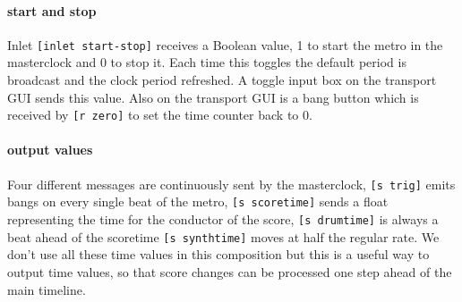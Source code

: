 \paragraph{start and stop}
Inlet \verb+[inlet start-stop]+ receives a Boolean value, 1 to start
the metro in the masterclock and 0 to stop it. Each time this
toggles the default period is broadcast and the clock period refreshed.
A toggle input box on the transport GUI sends this value. Also 
on the transport GUI is a bang button which is received by \verb+[r zero]+
to set the time counter back to 0.

\paragraph{output values}
Four different messages are continuously sent by the masterclock, 
\verb+[s trig]+ emits bangs on every single beat of the metro, 
\verb+[s scoretime]+ sends a float representing the time for the conductor of the score, 
\verb+[s drumtime]+ is always a beat ahead of the scoretime 
\verb+[s synthtime]+ moves at half the regular rate. We don't use all these time values 
in this composition but this is a useful way to output time values, so that score changes 
can be processed one step ahead of the main timeline.